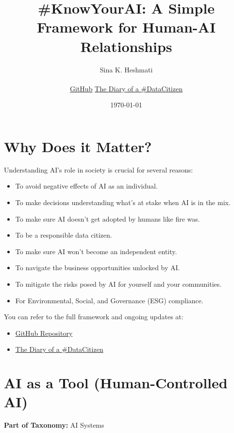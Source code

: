 \documentclass{article}
\title{\#KnowYourAI: A Simple Framework for Human-AI Relationships}
\author{Sina K. Heshmati \\ \\
\href{https://github.com/sindoc}{GitHub} \quad \href{https://lutino.substack.com/}{The Diary of a \#DataCitizen}}
\date{\today}
\begin{document}
\maketitle

\section*{Why Does it Matter?}
Understanding AI's role in society is crucial for several reasons:
\begin{itemize}
    \item To avoid negative effects of AI as an individual.
    \item To make decisions understanding what’s at stake when AI is in the mix.
    \item To make sure AI doesn’t get adopted by humans like fire was.
    \item To be a responsible data citizen.
    \item To make sure AI won’t become an independent entity.
    \item To navigate the business opportunities unlocked by AI.
    \item To mitigate the risks posed by AI for yourself and your communities.
    \item For Environmental, Social, and Governance (ESG) compliance.
\end{itemize}

\noindent You can refer to the full framework and ongoing updates at:
\begin{itemize}
    \item \href{https://github.com/sindoc/knowyourai-framework}{GitHub Repository}
    \item \href{https://lutino.substack.com/}{The Diary of a \#DataCitizen}
\end{itemize}

\newpage
\section*{AI as a Tool (Human-Controlled AI)}
\noindent \textbf{Part of Taxonomy:} AI Systems
\end{document}
